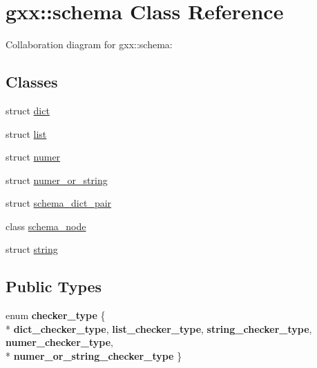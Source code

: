\hypertarget{classgxx_1_1schema}{}\section{gxx\+:\+:schema Class Reference}
\label{classgxx_1_1schema}


Collaboration diagram for gxx\+:\+:schema\+:
\subsection*{Classes}
\begin{DoxyCompactItemize}
\item 
struct \hyperlink{structgxx_1_1schema_1_1dict}{dict}
\item 
struct \hyperlink{structgxx_1_1schema_1_1list}{list}
\item 
struct \hyperlink{structgxx_1_1schema_1_1numer}{numer}
\item 
struct \hyperlink{structgxx_1_1schema_1_1numer__or__string}{numer\+\_\+or\+\_\+string}
\item 
struct \hyperlink{structgxx_1_1schema_1_1schema__dict__pair}{schema\+\_\+dict\+\_\+pair}
\item 
class \hyperlink{classgxx_1_1schema_1_1schema__node}{schema\+\_\+node}
\item 
struct \hyperlink{structgxx_1_1schema_1_1string}{string}
\end{DoxyCompactItemize}
\subsection*{Public Types}
\begin{DoxyCompactItemize}
\item 
enum {\bfseries checker\+\_\+type} \{ \\*
{\bfseries dict\+\_\+checker\+\_\+type}, 
{\bfseries list\+\_\+checker\+\_\+type}, 
{\bfseries string\+\_\+checker\+\_\+type}, 
{\bfseries numer\+\_\+checker\+\_\+type}, 
\\*
{\bfseries numer\+\_\+or\+\_\+string\+\_\+checker\+\_\+type}
 \}\hypertarget{classgxx_1_1schema_af437bf3704a7c922389df3023baddaab}{}\label{classgxx_1_1schema_af437bf3704a7c922389df3023baddaab}

\end{DoxyCompactItemize}
